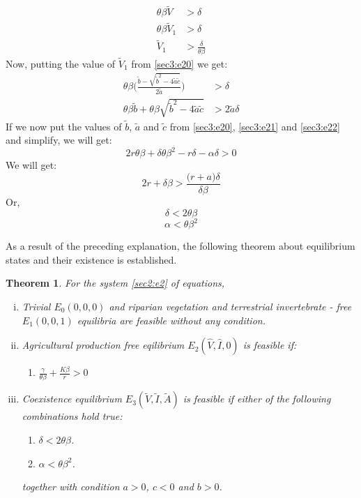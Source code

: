 \documentclass[12pt]{article}
\newtheorem{theorem}{Theorem}[section]
\numberwithin{equation}{section}
\begin{document}
\begin{enumerate}[i)]
\begin{align}\label{sec3:e22}
\theta \beta \tilde V &> \delta \\
\theta \beta \tilde V_1 &> \delta \\
\tilde V_1 &> \frac{\delta}{\theta \beta}
\end{align}
Now, putting the value of $\tilde V_1$ from \eqref{sec3:e20} we get:
\begin{align}\label{sec3:e23}
\theta \beta \bigg(  \frac{\tilde b - \sqrt{\tilde b^2 - 4\tilde a \tilde c}}{2 \tilde a} \bigg) &> \delta \\
\theta \beta \tilde b + \theta \beta \sqrt{\tilde b^2-4\tilde a \tilde c} &> 2\tilde a \delta 
\end{align}
If we now put the values of $\tilde b$, $\tilde a$ and $\tilde c$ from \eqref{sec3:e20}, \eqref{sec3:e21} and \eqref{sec3:e22} and simplify, we will get:
\begin{equation}\label{sec3:e24}
2r \theta \beta + \delta \theta \beta^2 - r\delta -\alpha \delta>0
\end{equation}
We will get:
\begin{equation}\label{sec3:e25}
2r + \delta \beta >\frac{\bigg(r+a\bigg)\delta}{\delta \beta}
\end{equation}
Or,
\begin{equation}\label{sec3:e26}
\delta < 2 \theta \beta
\end{equation}
\begin{equation}\label{sec3:e27}
\alpha < \theta \beta^2
\end{equation}
\end{enumerate}
As a result of the preceding explanation, the following theorem about equilibrium states and their existence is established.
\begin{theorem}\label{Theorem 3.3}
For the system \eqref{sec2:e2} of equations,
\begin{enumerate}[i.)]
\item Trivial $E_0(0,0,0)$ and riparian vegetation and terrestrial invertebrate - free $E_1(0,0,1)$ equilibria are feasible without any condition.
\item Agricultural production free eqilibrium $E_2(\hat V, \hat I, 0)$ is feasible if:
\begin{enumerate}
\item $\frac{\gamma}{\theta \beta} + \frac{K \beta}{r} >0$
\end{enumerate}
\item Coexistence equilibrium  $E_3(\tilde V, \tilde I, \tilde A)$ is feasible if either of the following combinations hold true:
\begin{enumerate}
     \item $\delta < 2 \theta \beta$.
     \item $\alpha < \theta \beta^2$.
\end{enumerate}
     together with condition $a>0$, $c<0$ and $b>0$.
\end{enumerate}
\end{theorem}
\vspace{-1cm}
\end{document}
